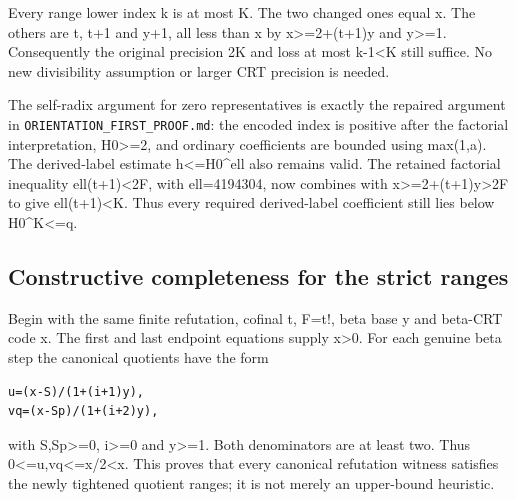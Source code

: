 Every range lower index k is at most K. The two changed ones equal x. The others are t, t+\allowbreak{}1 and y+\allowbreak{}1, all less than x by x\textgreater{}\allowbreak{}=\allowbreak{}2+\allowbreak{}(t+\allowbreak{}1)y and y\textgreater{}\allowbreak{}=\allowbreak{}1. Consequently the original precision 2K and loss at most k-1\textless{}\allowbreak{}K still suffice. No new divisibility assumption or larger CRT precision is needed.



The self-radix argument for zero representatives is exactly the repaired argument in \texttt{ORIENTATION\_\allowbreak{}FIRST\_\allowbreak{}PROOF.md}: the encoded index is positive after the factorial interpretation, H0\textgreater{}\allowbreak{}=\allowbreak{}2, and ordinary coefficients are bounded using max(1,a). The derived-label estimate h\textless{}\allowbreak{}=\allowbreak{}H0\textasciicircum{}\allowbreak{}ell also remains valid. The retained factorial inequality ell(t+\allowbreak{}1)\textless{}\allowbreak{}2F, with ell=\allowbreak{}4194304, now combines with x\textgreater{}\allowbreak{}=\allowbreak{}2+\allowbreak{}(t+\allowbreak{}1)y\textgreater{}\allowbreak{}2F to give ell(t+\allowbreak{}1)\textless{}\allowbreak{}K. Thus every required derived-label coefficient still lies below H0\textasciicircum{}\allowbreak{}K\textless{}\allowbreak{}=\allowbreak{}q.



\subsection{Constructive completeness for the strict ranges}



Begin with the same finite refutation, cofinal t, F=\allowbreak{}t!, beta base y and beta-CRT code x. The first and last endpoint equations supply x\textgreater{}\allowbreak{}0. For each genuine beta step the canonical quotients have the form



\begin{verbatim}
u=(x-S)/(1+(i+1)y),
vq=(x-Sp)/(1+(i+2)y),
\end{verbatim}

with S,Sp\textgreater{}\allowbreak{}=\allowbreak{}0, i\textgreater{}\allowbreak{}=\allowbreak{}0 and y\textgreater{}\allowbreak{}=\allowbreak{}1. Both denominators are at least two. Thus 0\textless{}\allowbreak{}=\allowbreak{}u,vq\textless{}\allowbreak{}=\allowbreak{}x/\allowbreak{}2\textless{}\allowbreak{}x. This proves that every canonical refutation witness satisfies the newly tightened quotient ranges; it is not merely an upper-bound heuristic.



